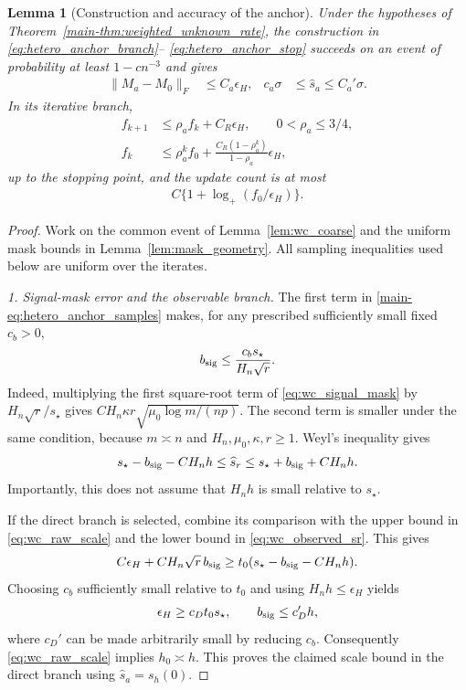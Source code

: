 \documentclass[numsec,webpdf,modern,large,namedate]{oup-authoring-template}
\theoremstyle{plain}
\newtheorem{slemma}{Lemma}%
\theoremstyle{remark}
\newif\ifmarkchanges
\newenvironment{revision}{\begingroup\ifmarkchanges\color{red}\fi}{\endgroup}
\begin{document}
\begin{revision}
\begin{slemma}[Construction and accuracy of the anchor]
\label{lem:wc_anchor}
Under the hypotheses of Theorem~\ref{main-thm:weighted_unknown_rate}, the
construction in \eqref{eq:hetero_anchor_branch}--
\eqref{eq:hetero_anchor_stop} succeeds on an event of probability at
least $1-cn^{-3}$ and gives
\begin{align}
 \|M_a-M_0\|_F&\le C_a\epsilon_H,&
 c_a\sigma&\le\widehat s_a\le C_a'\sigma.
 \label{eq:wc_anchor_result}
\end{align}
In its iterative branch,
\begin{align}
 f_{k+1}&\le\rho_a f_k+C_R\epsilon_H,
               \qquad 0<\rho_a\le3/4,\label{eq:wc_rec}\\
 f_k&\le\rho_a^k f_0+
        \frac{C_R(1-\rho_a^k)}{1-\rho_a}\epsilon_H,
 \label{eq:wc_geometric}
\end{align}
up to the stopping point, and the update count is at most
\begin{align}
 C\{1+\log_+(f_0/\epsilon_H)\}.
 \label{eq:hetero_anchor_complexity}
\end{align}
\end{slemma}
\begin{proof}
Work on the common event of Lemma~\ref{lem:wc_coarse} and the uniform
mask bounds in Lemma~\ref{lem:mask_geometry}. All sampling inequalities
used below are uniform over the iterates.

\textit{1. Signal-mask error and the observable branch.}
The first term in \eqref{main-eq:hetero_anchor_samples} makes, for any
prescribed sufficiently small fixed $c_b>0$,
\begin{align}
 b_{\rm sig}\le\frac{c_bs_\star}{H_n\sqrt r}.
 \label{eq:wc_mask_small}
\end{align}
Indeed, multiplying the first square-root term of
\eqref{eq:wc_signal_mask} by $H_n\sqrt r/s_\star$ gives
$C H_n\kappa r\sqrt{\mu_0\log m/(np)}$.
The second term is smaller under the same condition, because $m\asymp n$
and $H_n,\mu_0,\kappa,r\ge1$.
Weyl's inequality gives
\begin{align}
 s_\star-b_{\rm sig}-CH_nh
 \le\widehat s_r
 \le s_\star+b_{\rm sig}+CH_nh.
 \label{eq:wc_observed_sr}
\end{align}
Importantly, this does not assume that $H_nh$ is small relative to
$s_\star$.

If the direct branch is selected, combine its comparison with the upper
bound in \eqref{eq:wc_raw_scale} and the lower bound in
\eqref{eq:wc_observed_sr}. This gives
\[
 C\epsilon_H+CH_n\sqrt r\,b_{\rm sig}
 \ge t_0(s_\star-b_{\rm sig}-CH_nh).
\]
Choosing $c_b$ sufficiently small relative to $t_0$ and using
$H_nh\le\epsilon_H$ yields
\begin{align}
 \epsilon_H\ge c_Dt_0s_\star,
 \qquad b_{\rm sig}\le c_D' h,
 \label{eq:wc_direct_comparison}
\end{align}
where $c_D'$ can be made arbitrarily small by reducing $c_b$.
Consequently \eqref{eq:wc_raw_scale} implies $h_0\asymp h$.
This proves the claimed scale bound in the direct branch using
$\widehat s_a=s_h(0)$.


\end{proof}
\end{revision}
\end{document}
